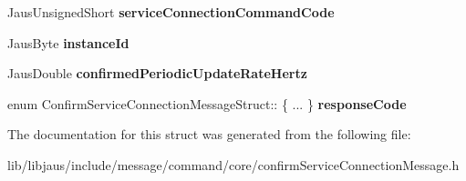\begin{DoxyCompactItemize}
\item 
\hypertarget{struct_confirm_service_connection_message_struct_abf85cdbce5ee6353d29a453045738e21}{\-Jaus\-Unsigned\-Short {\bfseries service\-Connection\-Command\-Code}}\label{struct_confirm_service_connection_message_struct_abf85cdbce5ee6353d29a453045738e21}

\item 
\hypertarget{struct_confirm_service_connection_message_struct_a5db8208c61fb8dda2d5249f74bb60af3}{\-Jaus\-Byte {\bfseries instance\-Id}}\label{struct_confirm_service_connection_message_struct_a5db8208c61fb8dda2d5249f74bb60af3}

\item 
\hypertarget{struct_confirm_service_connection_message_struct_a12cff42b2e09c8dbc506fd24d4008ed6}{\-Jaus\-Double {\bfseries confirmed\-Periodic\-Update\-Rate\-Hertz}}\label{struct_confirm_service_connection_message_struct_a12cff42b2e09c8dbc506fd24d4008ed6}

\item 
\hypertarget{struct_confirm_service_connection_message_struct_a2b1f4a533d915a136b727fadb84505df}{enum \*
\-Confirm\-Service\-Connection\-Message\-Struct\-:: \{ ... \}  {\bfseries response\-Code}}\label{struct_confirm_service_connection_message_struct_a2b1f4a533d915a136b727fadb84505df}

\end{DoxyCompactItemize}


\-The documentation for this struct was generated from the following file\-:\begin{DoxyCompactItemize}
\item 
lib/libjaus/include/message/command/core/confirm\-Service\-Connection\-Message.\-h\end{DoxyCompactItemize}
